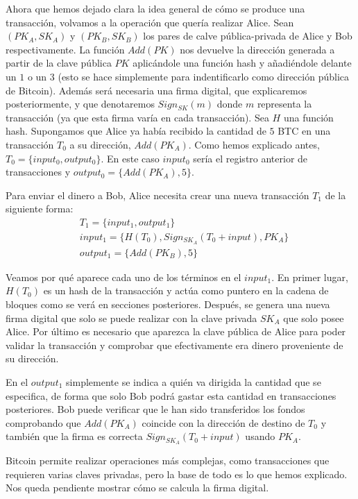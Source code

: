 \documentclass[twoside]{article}
\theoremstyle{definition}
\begin{document}
Ahora que hemos dejado clara la idea general de cómo se produce una transacción, volvamos a la operación que quería realizar Alice. Sean $(PK_A,SK_A)$ y $(PK_B,SK_B)$ los pares de calve pública-privada de Alice y Bob respectivamente. La función $Add(PK)$ nos devuelve la dirección generada a partir de la clave pública $PK$ aplicándole una función hash y añadiéndole delante un $1$ o un $3$ (esto se hace simplemente para indentificarlo como dirección pública de Bitcoin). Además será necesaria una firma digital, que explicaremos posteriormente, y que denotaremos $Sign_{SK}(m)$ donde $m$ representa la transacción (ya que esta firma varía en cada transacción). Sea $H$ una función hash. Supongamos que Alice ya había recibido la cantidad de $5$ BTC en una transacción $T_0$ a su dirección, $Add(PK_A)$.  Como hemos explicado antes, $T_0=\{input_0, output_0\}$. En este caso $input_0$ sería el registro anterior de transacciones y $output_0=\{Add(PK_A),5\}$. 

Para enviar el dinero a Bob, Alice necesita crear una nueva transacción $T_1$ de la siguiente forma:
\begin{align*}
&T_1=\{input_1,output_1\}\\
&input_1=\{H(T_0),Sign_{SK_A}(T_0+input),PK_A\}\\
&output_1=\{Add(PK_B),5\}
\end{align*}

Veamos por qué aparece cada uno de los términos en el $input_1$. En primer lugar, $H(T_0)$ es un hash de la transacción y actúa como puntero en la cadena de bloques como se verá en secciones posteriores. Después, se genera una nueva firma digital que solo se puede realizar con la clave privada $SK_A$ que solo posee Alice. Por último es necesario que aparezca la clave pública de Alice para poder validar la transacción y comprobar que efectivamente era dinero proveniente de su dirección. 

En el $output_1$ simplemente se indica a quién va dirigida la cantidad que se especifica, de forma que solo Bob podrá gastar esta cantidad en transacciones posteriores. Bob puede verificar que le han sido transferidos los fondos comprobando que $Add(PK_A)$ coincide con la dirección de destino de $T_0$ y también que la firma es correcta $Sign_{SK_A}(T_0+input)$ usando $PK_A$. 

Bitcoin permite realizar operaciones más complejas, como transacciones que requieren varias claves privadas, pero la base de todo es lo que hemos explicado. Nos queda pendiente mostrar cómo se calcula la firma digital.
\end{document}
